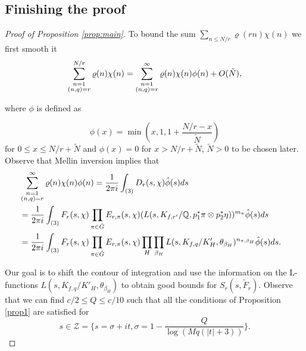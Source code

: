 \documentclass[12pt]{amsart}
\def\Q{{\mathbb Q}}
\def\\{\cr}
\def\le{\leqslant}
\begin{document}
\subsection{Finishing the proof}
\begin{proof}[Proof of Proposition \ref{prop:main}]
To bound the sum $\sum_{n \le N/r} \varrho(rn)\chi(n)$ we first smooth it 
\begin{align*}
\sum_{\substack{n=1 \\ (n,q)=r}}^{N/r}\varrho(n) \chi(n) = \sum_{\substack{n=1 \\ (n,q)=r}}^\infty \varrho(n)\chi(n) \phi(n) + O(\tilde{N}),
\end{align*}

where $\phi$ is defined as

$$\phi(x) = \min\left( x, 1, 1+ \frac{N/r-x}{\tilde{N}} \right)$$
for $0 \le x \le N/r + \tilde{N}$ and $\phi(x) = 0$ for $x> N/r + \tilde{N}$,  $\tilde{N}>0$ to be chosen later. 
Observe that Mellin inversion implies that
\begin{equation}
\begin{split}
\label{eq:mellin}
&\sum_{\substack{n=1 \\ (n,q)=r}}^\infty  \varrho(n)\chi(n) \phi(n)   = \frac{1}{2\pi i}\int_{(3)} D_r(s,\chi) \hat{\phi}(s)ds \\
& =  \frac1{2\pi i } \int_{(3)} F_{r}(s,\chi) \prod_{\pi \in \hat{G}} E_{r, \pi}(s,\chi) (L(s, K_{f,r'}/\Q, p_1^\ast \pi \otimes p_2^\ast \eta))^{m_\pi}\hat{\phi}(s) ds \\
& = \frac1{2\pi i } \int_{(3)} F_{r}(s,\chi) \prod_{\pi \in \hat{G}} E_{r, \pi}(s,\chi)  \prod_{H}\prod_{\beta_H} L(s, K_{f,q} /K'_H, \theta_{\beta_H})^{n_{\pi, \beta_H}} \hat{\phi}(s)ds.
\end{split}
\end{equation}

Our goal is to shift the contour of integration and use the information  on the L-functions $ L(s, K_{f,q} /K'_H, \theta_{\beta_H})$ to obtain good bounds for $S_r(s,\tilde{F}_r)$.  Observe that we can find $c/2 \le Q \le c/10$ such that all the conditions of Proposition \ref{prop1} are satisfied for $$s \in  \mathcal{Z} = \{ s=\sigma + it, \sigma = 1 - \frac{Q}{\log{(M{q}(|t|+3))}} \}.$$




\end{proof}
\end{document}

